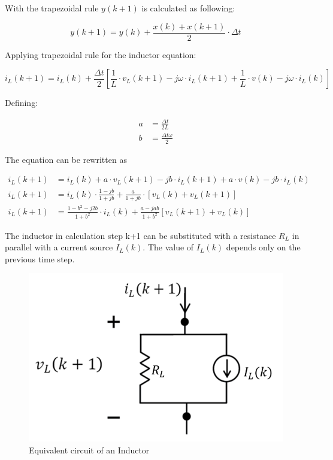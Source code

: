 With the trapezoidal rule $y(k+1)$ is calculated as following:

\begin{equation}
	y(k+1)=y(k)+ \frac{x(k)+x(k+1)}{2} \cdot \Delta t
\end{equation}

Applying trapezoidal rule for the inductor equation:

\begin{equation}
        i_L(k+1) = i_L(k) + \frac{\Delta t}{2} \left[ \frac{1}{L} \cdot v_L(k+1) - j \omega \cdot i_L(k+1) + \frac{1}{L} \cdot v(k) - j \omega \cdot i_L(k) \right]
\end{equation}

Defining:

\begin{align}
	a &= \frac{\Delta t}{2L} \\
	b &= \frac{\Delta t \omega}{2}
\end{align}
		
The equation can be rewritten as

\begin{align}
        i_L(k+1) &= i_L(k) + a \cdot v_L(k+1) - j b \cdot i_L(k+1) + a \cdot v(k) - j b \cdot i_L(k) \\
        i_L(k+1) &= i_L(k) \cdot \frac{1-jb}{1+jb} + \frac{a}{1+jb} \cdot [v_L(k)+v_L(k+1)] \\
        i_L(k+1) &= \frac{1-b^2-j2b}{1+b^2} \cdot i_L(k) + \frac{a-jab}{1+b^2} \left[ v_L(k+1) + v_L(k) \right]
\end{align}

The inductor in calculation step k+1 can be substituted with a resistance $R_L$ in parallel with a current source $I_L(k)$. The value of $I_L(k)$ depends only on the previous time step.

\begin{figure}[ht]
	\centering
	\includegraphics[scale=0.6]{img/Inductor.png} 
	\caption{Equivalent circuit of an Inductor}
	\label{fig:Inductor}
\end{figure}


